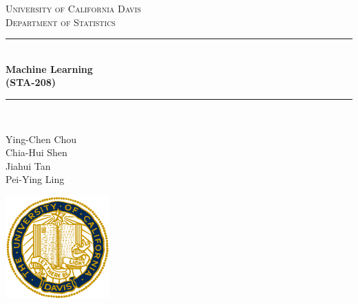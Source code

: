 \documentclass[12pt]{article}
\begin{document}
\begin{titlepage}

\newcommand{\HRule}{\rule{\linewidth}{0.5mm}} %

\center %
 

\textsc{\LARGE University of California Davis }\\[0.3cm] 
\textsc{\Large Department of Statistics}\\[0.5cm] 


\HRule \\[0.4cm]
{ \huge \bfseries Machine Learning\\  (STA-208)}\\[0.03cm]
\HRule \\[1.5cm]

\hfill \break \hfill \break \hfill \break
\hfill \break \hfill \break \hfill \break 
\hfill \break \hfill \break \hfill \break
\hfill \break

{\large Ying-Chen Chou \\ Chia-Hui Shen \\Jiahui Tan\\ Pei-Ying Ling}\\

\hfill \break

\includegraphics[width=4cm]{./plots/logo.png}\\[1cm] 


 

\vfill %

\end{titlepage}
\end{document}
